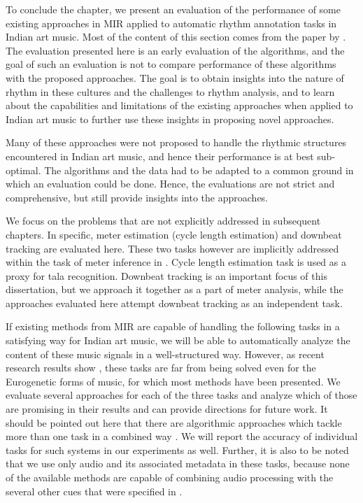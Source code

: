 To conclude the chapter, we present an evaluation of the performance of some existing approaches in \gls{MIR} applied to automatic rhythm annotation tasks in Indian art music. Most of the content of this section comes from the paper by . The evaluation presented here is an early evaluation of the algorithms, and the goal of such an evaluation is not to compare performance of these algorithms with the proposed approaches. The goal is to obtain insights into the nature of rhythm in these cultures and the challenges to rhythm analysis, and to learn about the capabilities and limitations of the existing approaches when applied to Indian art music to further use these insights in proposing novel approaches. 

Many of these approaches were not proposed to handle the rhythmic structures encountered in Indian art music, and hence their performance is at best sub-optimal. The algorithms and the data had to be adapted to a common ground in which an evaluation could be done. Hence, the evaluations are not strict and comprehensive, but still provide insights into the approaches. 

We focus on the problems that are not explicitly addressed in subsequent chapters. In specific, meter estimation (cycle length estimation) and downbeat tracking are evaluated here. These two tasks however are implicitly addressed within the task of meter inference in . Cycle length estimation task is used as a proxy for \gls{tala} recognition. Downbeat tracking is an important focus of this dissertation, but we approach it together as a part of meter analysis, while the approaches evaluated here attempt downbeat tracking as an independent task. 

If existing methods from \gls{MIR} are capable of handling the following tasks in a satisfying way for Indian art music, we will be able to automatically analyze the content of these music signals in a well-structured way. However, as recent research results show \cite{holzapfel:12:beat}, these tasks are far from being solved even for the Eurogenetic forms of music, for which most methods have been presented. We evaluate several approaches for each of the three tasks and analyze which of those are promising in their results and can provide directions for future work. It should be pointed out here that there are algorithmic approaches which tackle more than one task in a combined way \cite[e.g.,]{klapuri:06:meter}. We will report the accuracy of individual tasks for such systems in our experiments as well. Further, it is also to be noted that we use only audio and its associated metadata in these tasks, because none of the available methods are capable of combining audio processing with the several other cues that were specified in .
